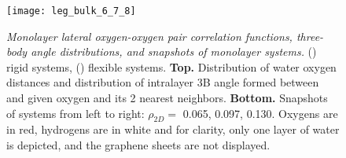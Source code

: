 \documentclass[12pt]{article}
\begin{document}
\setlength{\fboxsep}{0.75pt}%
\setlength{\fboxrule}{1.2pt}%

\begin{figure}[h!]
	\centering
	\texttt{[image: leg\_bulk\_6\_7\_8]}\\
	\caption{\textit{Monolayer lateral oxygen-oxygen pair correlation functions, three-body angle distributions, and snapshots of monolayer systems.} (\protect{}) rigid systems, (\protect{}) flexible systems. \textbf{Top.} Distribution of water oxygen distances and distribution of intralayer 3B angle formed between and given oxygen and its 2 nearest neighbors. \textbf{Bottom.} Snapshots of systems from left to right: \(\rho_{2D}=\) 0.065, 0.097, 0.130. Oxygens are in red, hydrogens are in white and for clarity, only one layer of water is depicted, and the graphene sheets are not displayed.}
	\label{fig:struct_6_7_8}
\end{figure}
\end{document}
